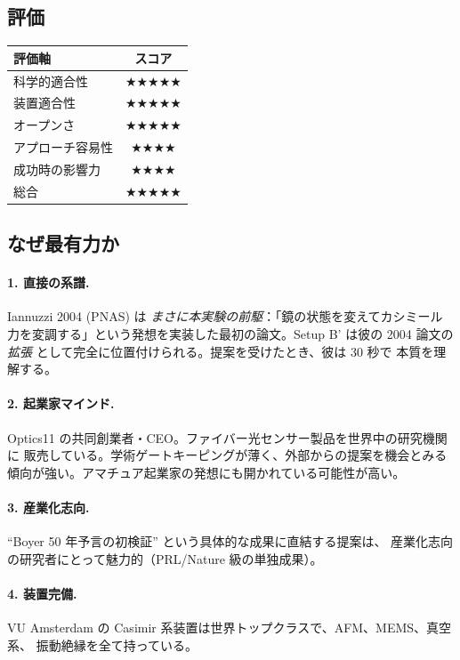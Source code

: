 \documentclass[11pt,a4paper]{article}
\def\textbf#1{#1}%
\begin{document}
\subsection{評価}

\begin{center}
\begin{tabular}{lc}
\toprule
評価軸 & スコア \\
\midrule
科学的適合性    & ★★★★★ \\
装置適合性      & ★★★★★ \\
オープンさ      & ★★★★★ \\
アプローチ容易性 & ★★★★ \\
成功時の影響力  & ★★★★ \\
\midrule
\textbf{総合}   & \textbf{★★★★★} \\
\bottomrule
\end{tabular}
\end{center}

\subsection{なぜ最有力か}

\paragraph{1. 直接の系譜.}
Iannuzzi 2004 (PNAS) は \emph{まさに本実験の前駆}：「鏡の状態を変えてカシミール
力を変調する」という発想を実装した最初の論文。Setup B' は彼の 2004 論文の
\emph{拡張} として完全に位置付けられる。提案を受けたとき、彼は 30 秒で
本質を理解する。

\paragraph{2. 起業家マインド.}
Optics11 の共同創業者・CEO。ファイバー光センサー製品を世界中の研究機関に
販売している。\textbf{学術ゲートキーピングが薄く、外部からの提案を機会とみる
傾向}が強い。アマチュア起業家の発想にも開かれている可能性が高い。

\paragraph{3. 産業化志向.}
``Boyer 50 年予言の初検証'' という具体的な成果に直結する提案は、
産業化志向の研究者にとって魅力的（PRL/Nature 級の単独成果）。

\paragraph{4. 装置完備.}
VU Amsterdam の Casimir 系装置は世界トップクラスで、AFM、MEMS、真空系、
振動絶縁を全て持っている。
\end{document}
